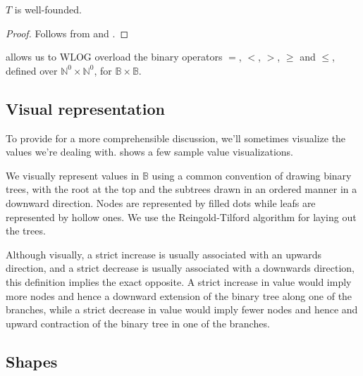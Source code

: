 \begin{corollary} $T$ is well-founded.\end{corollary}

\begin{proof} Follows from  and
.\end{proof} 

\begin{definition}  allows us to WLOG overload the
binary operators $=$, $<$, $>$, $\geq$ and $\leq$, defined over
$\mathbb{N}^0\times\mathbb{N}^0$, for
$\mathbb{B}\times\mathbb{B}$.\end{definition}

\subsection{Visual representation}

To provide for a more comprehensible discussion, we'll sometimes visualize the
values we're dealing with.  shows a few
sample value visualizations.

\begin{definition}\label{definition:value-visualization} We visually represent
values in $\mathbb{B}$ using a common convention of drawing binary trees, with
the root at the top and the subtrees drawn in an ordered manner in a downward
direction. Nodes are represented by filled dots while leafs are represented by
hollow ones. We use the Reingold-Tilford algorithm\cite{reingold-tilford} for
laying out the trees.\end{definition}


Although visually, a strict increase is usually associated with an upwards
direction, and a strict decrease is usually associated with a downwards
direction, this definition implies the exact opposite. A strict increase in
value would imply more nodes and hence a downward extension of the binary tree
along one of the branches, while a strict decrease in value would imply fewer
nodes and hence and upward contraction of the binary tree in one of the
branches.

\subsection{Shapes}

